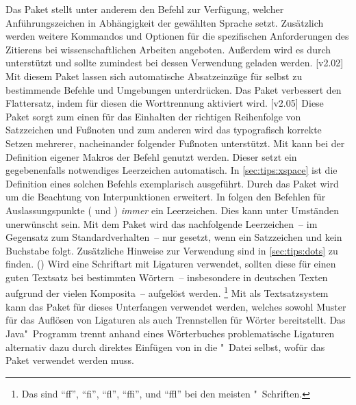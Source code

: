 \begin{DeclarePackages}
  Das Paket stellt unter anderem den Befehl  zur 
  Verfügung, welcher Anführungszeichen in Abhängigkeit der gewählten Sprache 
  setzt. Zusätzlich werden weitere Kommandos und Optionen für die spezifischen 
  Anforderungen des Zitierens bei wissenschaftlichen Arbeiten angeboten. 
  Außerdem wird es durch  unterstützt und sollte zumindest 
  bei dessen Verwendung geladen werden.
[v2.02]
  Mit diesem Paket lassen sich automatische Absatzeinzüge für selbst zu 
  bestimmende Befehle und Umgebungen unterdrücken.
  Das Paket verbessert den Flattersatz, indem für diesen die Worttrennung 
  aktiviert wird.
[v2.05]
  Diese Paket sorgt zum einen für das Einhalten der richtigen Reihenfolge von 
  Satzzeichen und Fußnoten und zum anderen wird das typografisch korrekte 
  Setzen mehrerer, nacheinander folgender Fußnoten unterstützt. 
  Mit  kann bei der Definition eigener Makros der Befehl 
   genutzt werden. Dieser setzt ein gegebenenfalls notwendiges 
  Leerzeichen automatisch. In \autoref{sec:tips:xspace} ist die Definition 
  eines solchen Befehls exemplarisch ausgeführt. Durch das Paket 
   wird  um die Beachtung von 
  Interpunktionen erweitert.
  In  folgen den Befehlen für Auslassungspunkte ( und 
  ) \emph{immer} ein Leerzeichen. Dies kann unter Umständen 
  unerwünscht sein. Mit dem Paket  wird das nachfolgende 
  Leerzeichen~-- im Gegensatz zum Standardverhalten~-- nur gesetzt, wenn ein 
  Satzzeichen und kein Buchstabe folgt. Zusätzliche Hinweise zur Verwendung 
  sind in \autoref{sec:tips:dots} zu finden.
()
  Wird eine Schriftart mit Ligaturen verwendet, sollten diese für einen guten 
  Textsatz bei bestimmten Wörtern~-- insbesondere in deutschen Texten aufgrund 
  der vielen Komposita~-- aufgelöst werden.%
  \footnote{%
    Das sind \enquote{ff}, \enquote{fi}, \enquote{fl}, \enquote{ffi}, und 
    \enquote{ffl} bei den meisten "~Schriften.%
  }
  Mit  als Textsatzsystem kann das Paket  
  für dieses Unterfangen verwendet werden, welches sowohl Muster für das 
  Auflösen von Ligaturen als auch Trennstellen für Wörter bereitstellt. 
  Das Java"~Programm  trennt anhand eines Wörterbuches 
  problematische Ligaturen alternativ dazu durch direktes Einfügen von 
   in die "~Datei selbst, wofür das Paket 
   verwendet werden muss.
\end{DeclarePackages}
%



